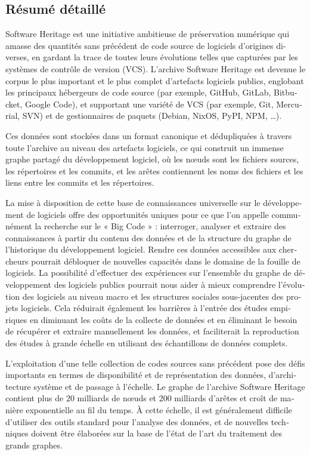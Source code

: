 \begin{otherlanguage}{french}
\chapter*{Résumé détaillé}

Software Heritage est une initiative ambitieuse de préservation numérique qui
amasse des quantités sans précédent de code source de logiciels d'origines
diverses, en gardant la trace de toutes leurs évolutions telles que capturées
par les systèmes de contrôle de version (VCS). L'archive Software Heritage est
devenue le corpus le plus important et le plus complet d'artefacts logiciels
publics, englobant les principaux hébergeurs de code source (par exemple,
GitHub, GitLab, Bitbucket, Google Code), et supportant une variété de VCS (par
exemple, Git, Mercurial, SVN) et de gestionnaires de paquets (Debian, NixOS,
PyPI, NPM, \ldots).

Ces données sont stockées dans un format canonique et dédupliquées à travers
toute l'archive au niveau des artefacts logiciels, ce qui construit un immense
graphe partagé du développement logiciel, où les nœuds sont les fichiers
sources, les répertoires et les commits, et les arêtes contiennent les noms des
fichiers et les liens entre les commits et les répertoires.

La mise à disposition de cette base de connaissances universelle sur le
développement de logiciels offre des opportunités uniques pour ce que l'on
appelle communément la recherche sur le « Big Code » : interroger, analyser et
extraire des connaissances à partir du contenu des données et de la structure
du graphe de l'historique du développement logiciel. Rendre ces données
accessibles aux chercheurs pourrait débloquer de nouvelles capacités dans le
domaine de la fouille de logiciels. La possibilité d'effectuer des expériences
sur l'ensemble du graphe de développement des logiciels publics pourrait nous
aider à mieux comprendre l'évolution des logiciels au niveau macro et les
structures sociales sous-jacentes des projets logiciels. Cela réduirait
également les barrières à l'entrée des études empiriques en diminuant les coûts
de la collecte de données et en éliminant le besoin de récupérer et extraire
manuellement les données, et faciliterait la reproduction des études à grande
échelle en utilisant des échantillons de données complets.

L'exploitation d'une telle collection de codes sources sans précédent pose des
défis importants en termes de disponibilité et de représentation des données,
d'architecture système et de passage à l'échelle. Le graphe de l'archive
Software Heritage contient plus de 20 milliards de nœuds et 200 milliards
d'arêtes et croît de manière exponentielle au fil du temps. À cette échelle, il
est généralement difficile d'utiliser des outils standard pour l'analyse des
données, et de nouvelles techniques doivent être élaborées sur la base de
l'état de l'art du traitement des grands graphes.


\end{otherlanguage}
